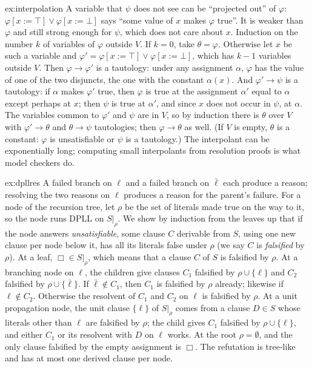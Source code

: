 \begin{solution}{ex:interpolation}
\idea A variable that $\psi$ does not see can be ``projected out'' of $\varphi$: $\varphi[x:=\top]\lor\varphi[x:=\bot]$ says ``some value of $x$ makes $\varphi$ true''.
It is weaker than $\varphi$ and still strong enough for $\psi$, which does not care about $x$.
\writeup Induction on the number $k$ of variables of $\varphi$ outside $V$. If $k=0$, take $\theta=\varphi$. Otherwise let $x$ be such a variable and
$\varphi'=\varphi[x:=\top]\lor\varphi[x:=\bot]$, which has $k-1$ variables outside $V$. Then $\varphi\to\varphi'$ is a tautology: under any assignment $\alpha$, $\varphi$ has the
value of one of the two disjuncts, the one with the constant $\alpha(x)$. And $\varphi'\to\psi$ is a tautology: if $\alpha$ makes $\varphi'$ true, then
$\varphi$ is true at the assignment $\alpha'$ equal to $\alpha$ except perhaps at $x$; then $\psi$ is true at $\alpha'$, and since $x$ does not occur in
$\psi$, at $\alpha$. The variables common to $\varphi'$ and $\psi$ are in $V$, so by induction there is $\theta$ over $V$ with $\varphi'\to\theta$ and $\theta\to\psi$
tautologies; then $\varphi\to\theta$ as well. (If $V$ is empty, $\theta$ is a constant: $\varphi$ is unsatisfiable or $\psi$ is a tautology.) The
interpolant can be exponentially long; computing small interpolants from resolution proofs is what model checkers do.
\end{solution}

\begin{solution}{ex:dpllres}
\idea A failed branch on $\ell$ and a failed branch on $\bar\ell$ each produce a reason; resolving the two reasons on $\ell$ produces a
reason for the parent's failure.
\writeup For a node of the recursion tree, let $\rho$ be the set of literals made true on the way to it, so the node runs DPLL on $S|_\rho$.
We show by induction from the leaves up that if the node answers \emph{unsatisfiable}, some clause $C$ derivable from $S$, using one
new clause per node below it, has all its literals false under $\rho$ (we say $C$ is \emph{falsified} by $\rho$). At a leaf, $\Box\in S|_\rho$, which
means that a clause $C$ of $S$ is falsified by $\rho$. At a branching node on $\ell$, the children give clauses $C_1$ falsified by $\rho\cup\{\ell\}$ and $C_2$
falsified by $\rho\cup\{\bar\ell\}$. If $\bar\ell\notin C_1$, then $C_1$ is falsified by $\rho$ already; likewise if $\ell\notin C_2$. Otherwise the resolvent of $C_1$ and
$C_2$ on $\ell$ is falsified by $\rho$. At a unit propagation node, the unit clause $\{\ell\}$ of $S|_\rho$ comes from a clause $D\in S$ whose literals other
than $\ell$ are falsified by $\rho$; the child gives $C_1$ falsified by $\rho\cup\{\ell\}$, and either $C_1$ or its resolvent with $D$ on $\ell$ works. At the
root $\rho=\emptyset$, and the only clause falsified by the empty assignment is $\Box$. The refutation is tree-like and has at most one
derived clause per node.
\end{solution}

